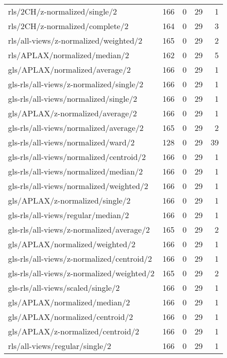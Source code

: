 \begin{longtable}{lrrrr}
    rls/2CH/z-normalized/single/2             & 166 &  0 & 29 &  1 \\
    rls/2CH/z-normalized/complete/2           & 164 &  0 & 29 &  3 \\
    rls/all-views/z-normalized/weighted/2     & 165 &  0 & 29 &  2 \\
    rls/APLAX/normalized/median/2             & 162 &  0 & 29 &  5 \\
    gls/APLAX/normalized/average/2            & 166 &  0 & 29 &  1 \\
    gls-rls/all-views/z-normalized/single/2   & 166 &  0 & 29 &  1 \\
    gls-rls/all-views/normalized/single/2     & 166 &  0 & 29 &  1 \\
    gls/APLAX/z-normalized/average/2          & 166 &  0 & 29 &  1 \\
    gls-rls/all-views/normalized/average/2    & 165 &  0 & 29 &  2 \\
    gls-rls/all-views/normalized/ward/2       & 128 &  0 & 29 & 39 \\
    gls-rls/all-views/normalized/centroid/2   & 166 &  0 & 29 &  1 \\
    gls-rls/all-views/normalized/median/2     & 166 &  0 & 29 &  1 \\
    gls-rls/all-views/normalized/weighted/2   & 166 &  0 & 29 &  1 \\
    gls/APLAX/z-normalized/single/2           & 166 &  0 & 29 &  1 \\
    gls-rls/all-views/regular/median/2        & 166 &  0 & 29 &  1 \\
    gls-rls/all-views/z-normalized/average/2  & 165 &  0 & 29 &  2 \\
    gls/APLAX/normalized/weighted/2           & 166 &  0 & 29 &  1 \\
    gls-rls/all-views/z-normalized/centroid/2 & 166 &  0 & 29 &  1 \\
    gls-rls/all-views/z-normalized/weighted/2 & 165 &  0 & 29 &  2 \\
    gls-rls/all-views/scaled/single/2         & 166 &  0 & 29 &  1 \\
    gls/APLAX/normalized/median/2             & 166 &  0 & 29 &  1 \\
    gls/APLAX/normalized/centroid/2           & 166 &  0 & 29 &  1 \\
    gls/APLAX/z-normalized/centroid/2         & 166 &  0 & 29 &  1 \\
    rls/all-views/regular/single/2            & 166 &  0 & 29 &  1 \\

\end{longtable}
